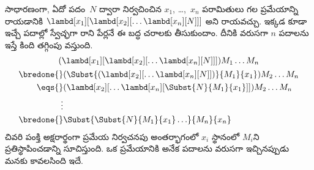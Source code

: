 \documentclass[../../../include/open-logic-section]{subfiles}
\begin{document}
సాధారణంగా, ఏదో పదం~$N$ ద్వారా నిర్వచించిన $x_1$, \dots,~$x_n$
పరామితులు గల ప్రమేయాన్ని రాయడానికి
$\lambd[x_1][\lambd[x_2][\ldots\lambd[x_n][N]]]$ అని రాయవచ్చు.
ఇక్కడ కూడా ఇచ్చే పదాల్లో స్వేచ్ఛగా రాని పేర్లనే ఈ బద్ధ చరాలకు
తీసుకుందాం. దీనికి వరుసగా $n$ పదాలను ఇస్తే కింది తగ్గింపు వస్తుంది.
\begin{multline*}
  (\lambd[x_1][\lambd[x_2][\ldots\lambd[x_n][N]]]) M_1 \dots M_n \\
  \begin{aligned}
  \bredone {} & (\Subst{(\lambd[x_2][\ldots\lambd[x_n][N]])}{M_1}{x_1}) M_2
  \dots M_n\\
   \eqs {} & (\lambd[x_2][\ldots\lambd[x_n][\Subst{N}{M_1}{x_1}]]) M_2
            \dots M_n \\
  \vdots & \\
  \bredone {} &\Subst{\Subst{N}{M_1}{x_1}\ldots}{M_n}{x_n}
  \end{aligned}
\end{multline*}
చివరి పంక్తి అక్షరార్థంగా ప్రమేయ నిర్వచనపు అంతర్భాగంలో $x_i$ స్థానంలో
$M_i$ని ప్రతిస్థాపించడాన్ని సూచిస్తుంది. ఒక ప్రమేయానికి అనేక పదాలను
వరుసగా ఇచ్చినప్పుడు మనకు కావలసింది ఇదే.
\end{document}
